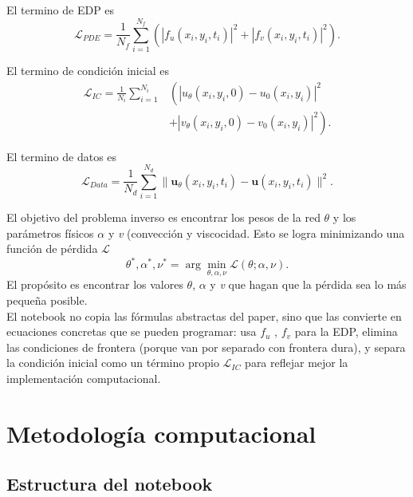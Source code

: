 \documentclass[10pt,letterpaper,twocolumn]{article}
\begin{document}
El termino de EDP es
\begin{equation}
    \mathcal{L}_{PDE}=\frac{1}{N_f}\sum_{i=1}^{N_f}\left(|f_u(x_i,y_i,t_i)|^2+|f_v(x_i,y_i,t_i)|^2\right).
\end{equation}

El termino de condición inicial es
\begin{equation}
\begin{split}
    \mathcal{L}_{IC}=\frac{1}{N_i}\sum_{i=1}^{N_i}&\left(|u_\theta(x_i,y_i,0)-u_0(x_i,y_i)|^2\right.\\
    &\left.+|v_\theta(x_i,y_i,0)-v_0(x_i,y_i)|^2\right).
\end{split}
\end{equation}

El termino de datos es
\begin{equation}
    \mathcal{L}_{Data}=\frac{1}{N_d}\sum_{i=1}^{N_d}\|\mathbf{u}_\theta(x_i,y_i,t_i)-\mathbf{u}(x_i,y_i,t_i)\|^2.
\end{equation}

El objetivo del problema inverso es encontrar los pesos de la red \(\theta\) y los parámetros físicos \(\alpha\) y \textit{v} (convección y viscocidad.
Esto se logra minimizando una función de pérdida \(\mathcal{L}\)
\begin{equation}
    \theta^*,\alpha^*,\nu^*=\arg\min_{\theta,\alpha,\nu}\mathcal{L}(\theta;\alpha,\nu).
\end{equation}
El propósito es encontrar los valores \(\theta\), \(\alpha\) y \textit{v} que hagan que la pérdida sea lo más pequeña posible.\\

El notebook no copia las fórmulas abstractas del paper, sino que las convierte en ecuaciones concretas que se pueden programar: usa $f_u$ , $f_v$ para la EDP, elimina las condiciones de frontera (porque van por separado con frontera dura), y separa la condición inicial como un término propio $\mathcal{L}_{IC}$ para reflejar mejor la implementación computacional.

\section{Metodología computacional}

\subsection{Estructura del notebook}
\end{document}
